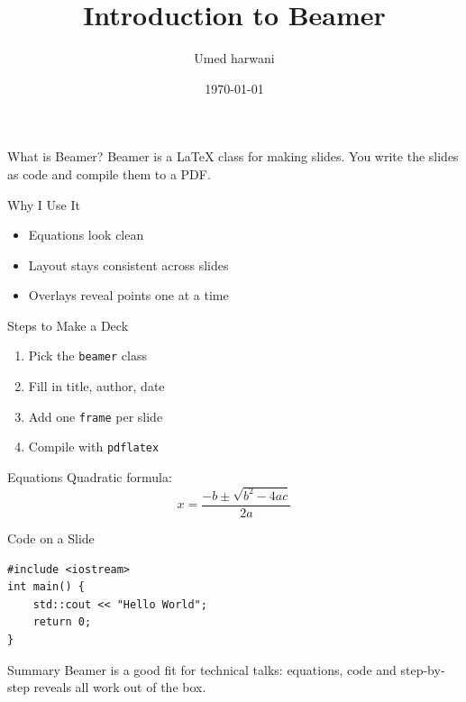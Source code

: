 \documentclass{beamer}
\title{Introduction to Beamer}
\author{Umed harwani}
\institute{MNIT Jaipur}
\date{\today}
\begin{document}
\begin{frame}
    \titlepage
\end{frame}

\begin{frame}{What is Beamer?}
Beamer is a LaTeX class for making slides.
You write the slides as code and compile them to a PDF.
\end{frame}

\begin{frame}{Why I Use It}
\begin{itemize}
    \item<1-> Equations look clean
    \item<2-> Layout stays consistent across slides
    \item<3-> Overlays reveal points one at a time
\end{itemize}
\end{frame}

\begin{frame}{Steps to Make a Deck}
\begin{enumerate}
    \item Pick the \texttt{beamer} class
    \item Fill in title, author, date
    \item Add one \texttt{frame} per slide
    \item Compile with \texttt{pdflatex}
\end{enumerate}
\end{frame}

\begin{frame}{Equations}
Quadratic formula:
\[
x=\frac{-b\pm\sqrt{b^2-4ac}}{2a}
\]
\end{frame}

\begin{frame}[fragile]{Code on a Slide}
\begin{verbatim}
#include <iostream>
int main() {
    std::cout << "Hello World";
    return 0;
}
\end{verbatim}
\end{frame}

\begin{frame}{Summary}
Beamer is a good fit for technical talks: equations, code and
step-by-step reveals all work out of the box.
\end{frame}
\end{document}
